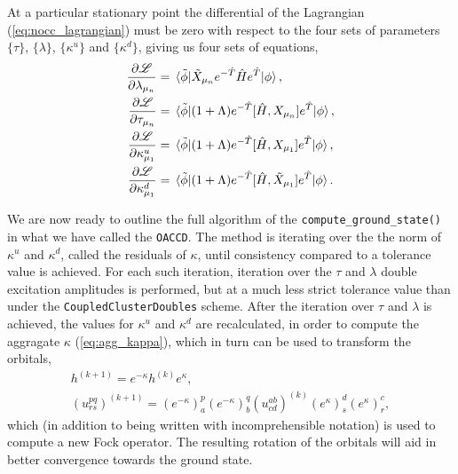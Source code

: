     At a particular stationary point the differential of the Lagrangian
    (\autoref{eq:nocc_lagrangian}) must be zero with respect to the four sets of 
    parameters $\{\tau\}$, $\{\lambda\}$, $\{\kappa^u\}$ and $\{\kappa^d\}$, giving
    us four sets of equations,
    \begin{align}
        \frac{\partial \mathscr{L}}{\partial \lambda_{\mu_n}}
            &= \mel*{\tilde{\phi}}
            {\tilde{X}_{\mu_n} e^{-\hat{T}}\hat{H}e^{\hat{T}}}
            {\phi}, \\
        \frac{\partial \mathscr{L}}{\partial \tau_{\mu_n}}
            &= \mel*{\tilde{\phi}}
            {(1 + \Lambda)e^{-\hat{T}}[\hat{H}, X_{\mu_n}]e^{\hat{T}}}
            {\phi}, \\
        \frac{\partial \mathscr{L}}{\partial \kappa^u_{\mu_1}}
            &= \mel*{\tilde{\phi}}
            {(1 + \Lambda)e^{-\hat{T}}[\hat{H}, X_{\mu_1}]e^{\hat{T}}}
            {\phi}, \\
        \frac{\partial \mathscr{L}}{\partial \kappa^d_{\mu_1}}
            &= \mel*{\tilde{\phi}}
            {(1 + \Lambda)e^{-\hat{T}}[\hat{H}, \tilde{X}_{\mu_1}]e^{\hat{T}}}
            {\phi}.
    \end{align}

    We are now ready to outline the full algorithm of the 
    \lstinline{compute_ground_state()} in what we have called the \lstinline{OACCD}.
    The method is iterating over the the norm of $\kappa^u$ and $\kappa^d$, called the 
    residuals of $\kappa$, until consistency compared to a tolerance value is achieved. 
    For each such iteration, iteration over the $\tau$ and $\lambda$ double excitation
    amplitudes is performed, but at a much less strict tolerance value than under the 
    \lstinline{CoupledClusterDoubles} scheme. After the iteration over $\tau$ and $\lambda$ 
    is achieved, the values for $\kappa^u$ and $\kappa^d$ are recalculated, in order to 
    compute the aggragate $\kappa$ (\autoref{eq:agg_kappa}), 
    which in turn can be used to transform the orbitals,
    \begin{equation*}
        \begin{gathered}
            h^{(k + 1)} = e^{-\kappa} h^{(k)} e^{\kappa}, \\
            (u^{pq}_{rs})^{(k + 1)}
            = (e^{-\kappa})^p_a (e^{-\kappa})^q_b 
                (u^{ab}_{cd})^{(k)}
            (e^{\kappa})^d_s (e^{\kappa})^c_r,
        \end{gathered}
    \end{equation*}
    which (in addition to being written with incomprehensible notation) is used to compute 
    a new Fock operator. The resulting rotation of the orbitals will aid in better 
    convergence towards the ground state.

